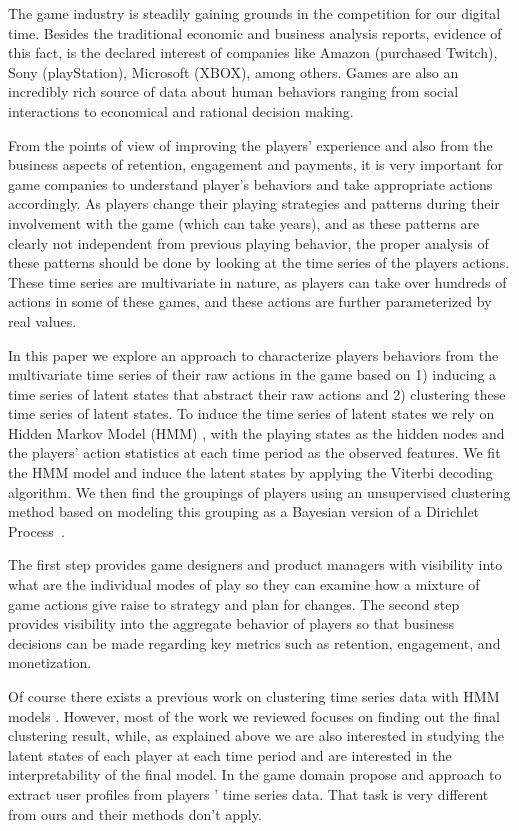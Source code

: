 The game industry is steadily gaining grounds in the competition for our digital time. Besides the traditional economic and business analysis reports, evidence of this fact, is the declared interest of companies like Amazon (purchased Twitch), Sony (playStation), Microsoft (XBOX), among others.  Games are also an incredibly rich source of data about human behaviors ranging from social interactions to economical and rational decision making.

From the points of view of improving the players' experience and also from the business aspects of retention, engagement  and payments, it is very important for game companies to understand  player's behaviors and take appropriate actions accordingly. As players change their playing strategies and patterns during their involvement with the game (which can take years), and as these patterns are clearly not independent from previous playing behavior, the proper analysis of these patterns should be done by looking at the time series of the players actions. These time series are multivariate in nature, as players can take over hundreds of actions in some of these games, and these actions are further parameterized by real values.

In this paper we explore an approach to characterize players behaviors from the multivariate time series of their raw actions in the game based on 
1) inducing a time series of latent states that abstract their raw actions and 2) clustering these time series of latent states.  To induce the time series of latent states we rely on  Hidden Markov Model (HMM) \cite{hmm}, with the playing states as 
the hidden nodes and the players' action statistics at each time period as the observed features.  We fit the HMM model and induce the latent  states by applying the Viterbi decoding algorithm.  We then find the groupings of players using an unsupervised clustering method based on modeling this grouping as a Bayesian version of a Dirichlet Process~\cite{}.

The first step provides game designers and product managers with visibility into what are the individual modes of play so they can examine how a mixture of game actions give raise to strategy and plan for changes.  The second step provides visibility into the aggregate behavior of players so that business decisions can be made regarding key metrics such as retention, engagement, and monetization. 

Of course there exists a previous work on clustering time series data with HMM models
\cite{Bicego2006,bicego2003,coviello2014}. However, most of the work we reviewed focuses on finding
out the final clustering result, while, as explained above we are also interested in studying
the latent states of each player at each time period and are interested in the interpretability of the final model. In the game domain  \cite{menendez2014} propose and approach to extract user profiles from players ' time series data.   That task is very different from ours and their methods don't apply. 


